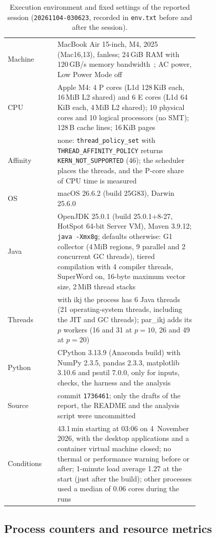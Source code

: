 \documentclass[11pt,a4paper]{article}
\newcommand{\session}{\texttt{20261104-030623}}
\begin{document}
\begin{table}[tbp]
\centering
\caption{Execution environment and fixed settings of the reported session
(\session, recorded in \texttt{env.txt} before and after the session).}
\label{tab:env}
\small
\begin{tabular}{@{}lp{0.74\linewidth}@{}}
\toprule
Machine & MacBook Air 15-inch, M4, 2025 (Mac16,13), fanless; 24\,GiB RAM with
120\,GB/s memory bandwidth~\cite{applem4}; AC power, Low Power Mode off \\
CPU & Apple M4: 4 P cores (L1d 128\,KiB each, 16\,MiB L2 shared) and 6 E cores
(L1d 64\,KiB each, 4\,MiB L2 shared); 10 physical cores and 10 logical
processors (no SMT); 128\,B cache lines; 16\,KiB pages \\
Affinity & none: \texttt{thread\_policy\_set} with
\texttt{THREAD\_AFFINITY\_POLICY} returns \texttt{KERN\_NOT\_SUPPORTED} (46);
the scheduler places the threads, and the P-core share of CPU time is measured \\
OS & macOS 26.6.2 (build 25G83), Darwin 25.6.0 \\
Java & OpenJDK 25.0.1 (build 25.0.1+8-27, HotSpot 64-bit Server VM), Maven
3.9.12; \texttt{java -Xmx8g}; defaults otherwise: G1 collector (4\,MiB regions,
9 parallel and 2 concurrent GC threads), tiered compilation with 4 compiler
threads, SuperWord on, 16-byte maximum vector size, 2\,MiB thread stacks \\
Threads & with ikj the process has 6 Java threads (21 operating-system threads,
including the JIT and GC threads); par\_ikj adds its $p$ workers (16 and 31 at
$p=10$, 26 and 49 at $p=20$) \\
Python & CPython 3.13.9 (Anaconda build) with NumPy 2.3.5, pandas 2.3.3,
matplotlib 3.10.6 and psutil 7.0.0, only for inputs, checks, the harness and
the analysis \\
Source & commit \texttt{1736461}; only the drafts of the report, the README
and the analysis script were uncommitted \\
Conditions & 43.1\,min starting at 03:06 on 4~November 2026, with the desktop
applications and a container virtual machine closed; no thermal or
performance warning before or after; 1-minute load average 1.27 at the start
(just after the build); other processes used a median of 0.06 cores during the
runs \\
\bottomrule
\end{tabular}
\end{table}

\subsection{Process counters and resource metrics}
\end{document}
